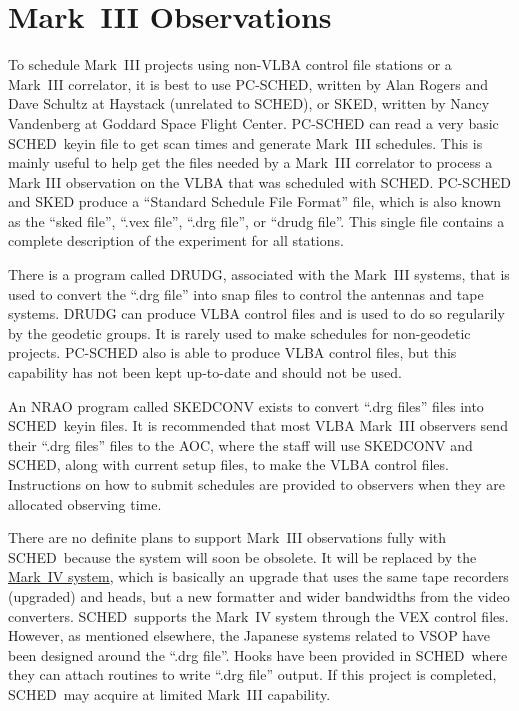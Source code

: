 \documentclass{report}
\newcommand{\sched}{{\sc SCHED}}
\newcommand{\schedb}{{\sc SCHED~}}
\begin{document}
\section{\label{SEC:MKIII}Mark~III Observations}

To schedule Mark~III projects using non-VLBA control file stations or
a Mark~III correlator, it is best to use {\sc PC-SCHED}, written by
Alan Rogers and Dave Schultz at Haystack (unrelated to \sched), or
{\sc SKED}, written by Nancy Vandenberg at Goddard Space Flight
Center.  {\sc PC-SCHED} can read a very basic \schedb keyin file to
get scan times and generate Mark~III schedules.  This is mainly useful
to help get the files needed by a Mark~III correlator to process a
Mark III observation on the VLBA that was scheduled with \sched.  {\sc
PC-SCHED} and {\sc SKED} produce a ``Standard Schedule File Format''
file, which is also known as the ``sked file'', ``.vex file'', ``.drg
file'', or ``drudg file''.  This single file contains a complete
description of the experiment for all stations.

There is a program called {\sc DRUDG}, associated with the Mark~III
systems, that is used to convert the ``.drg file'' into snap files to
control the antennas and tape systems.  {\sc DRUDG} can produce VLBA
control files and is used to do so regularily by the geodetic groups.
It is rarely used to make schedules for non-geodetic projects.  {\sc
PC-SCHED} also is able to produce VLBA control files, but this
capability has not been kept up-to-date and should not be used.

An NRAO program called {\sc SKEDCONV} exists to convert ``.drg files''
files into \schedb keyin files. It is recommended that most VLBA
Mark~III observers send their ``.drg files'' files to the AOC,
where the staff will use {\sc SKEDCONV} and \sched, along with
current setup files, to make the VLBA control files.  Instructions on
how to submit schedules are provided to observers when they are
allocated observing time.

There are no definite plans to support Mark~III observations fully
with \schedb because the system will soon be obsolete.  It will be
replaced by the 
{\hyperref[SSEC:MKIV]{Mark~IV system}}, which is basically
an upgrade that uses the same tape recorders (upgraded) and heads, but
a new formatter and wider bandwidths from the video converters.
\schedb supports the Mark~IV system through the VEX control files.
However, as mentioned elsewhere, the Japanese systems related to VSOP
have been designed around the ``.drg file''.  Hooks have been provided
in \schedb where they can attach routines to write ``.drg file''
output.  If this project is completed, \schedb may acquire at limited
Mark~III capability.
\end{document}
